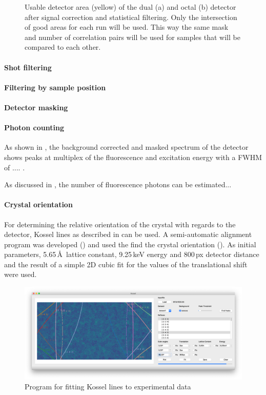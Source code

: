 \begin{figure}
\begin{subfigure}{0.45\textwidth}
	\end{subfigure}
	\caption[Usable detector area]{Usable detector area (yellow) of the dual (a) and octal (b) detector after signal correction and statistical filtering. Only the intersection of good areas for each run will be used. This way the same mask and number of correlation pairs will be used for samples that will be compared to each other.}	
\end{figure}

\paragraph{Shot filtering}

\paragraph{Filtering by sample position}
\paragraph{Detector masking}

\paragraph{Photon counting}



As shown in , the background corrected and masked spectrum of the detector shows peaks at multiplex of the fluorescence and excitation energy with a FWHM of .... . 


As discussed in , the number of fluorescence photons can be estimated...




\paragraph{Crystal orientation}
For determining the relative orientation of the crystal with regards to the detector, Kossel lines as described in  can be used.  A semi-automatic alignment program was developed () and used the find the crystal orientation (). As initial parameters, 5.65\,\AA\, lattice constant, 9.25\,keV energy and 800\,px detector distance and the result of a simple 2D cubic fit for the values of the translational shift were used. 
\begin{figure}
	\centering
	\includegraphics[width=0.8\linewidth]{images/kosselfit.png}
	\caption{Program for fitting Kossel lines to experimental data}
	\label{fig:kosselfit}
\end{figure}


